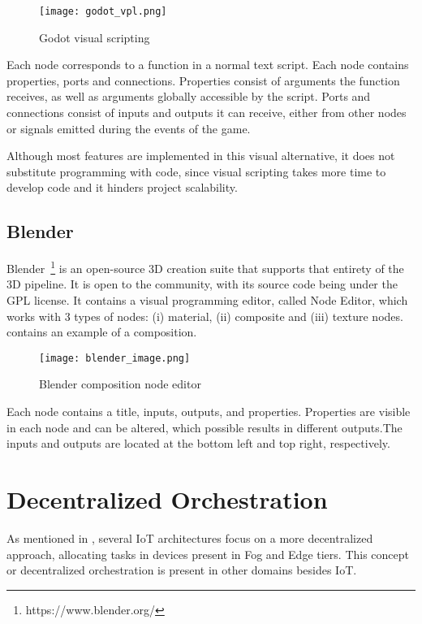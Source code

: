 \begin{figure}[!ht]
\centering
\texttt{[image: godot\_vpl.png]}
\caption[Godot visual scripting]{Godot visual scripting~\cite{godot_image}}
\label{fig:godot}
\end{figure}

Each node corresponds to a function in a normal text script. Each node contains properties, ports and connections. Properties consist of arguments the function receives, as well as arguments globally accessible by the script. Ports and connections consist of inputs and outputs it can receive, either from other nodes or signals emitted during the events of the game.

Although most features are implemented in this visual alternative, it does not substitute programming with code, since visual scripting takes more time to develop code and it hinders project scalability.

\subsection{Blender}\label{sec:blender}

Blender~\footnote{https://www.blender.org/} is an open-source 3D creation suite that supports that entirety of the 3D pipeline. It is open to the community, with its source code being under the GPL license. It contains a visual programming editor, called Node Editor, which works with 3 types of nodes: (i) material, (ii) composite and (iii) texture nodes.  contains an example of a composition.

\begin{figure}[!ht]
\centering
\texttt{[image: blender\_image.png]}
\caption[Blender composition node editor]{Blender composition node editor~\cite{blender_image}}
\label{fig:blender}
\end{figure}

Each node contains a title, inputs, outputs, and properties. Properties are visible in each node and can be altered, which possible results in different outputs.The inputs and outputs are located at the bottom left and top right, respectively. 

\section{Decentralized Orchestration}\label{sec:background_decentralized_orchestration}

As mentioned in , several IoT architectures focus on a more decentralized approach, allocating tasks in devices present in Fog and Edge tiers. This concept or decentralized orchestration is present in other domains besides IoT.

